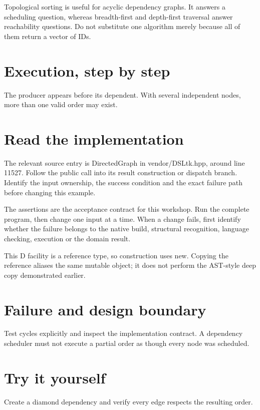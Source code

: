 \clearpage
{}
Topological sorting is useful for acyclic dependency graphs. It answers a scheduling question, whereas breadth-first and depth-first traversal answer reachability questions. Do not substitute one algorithm merely because all of them return a vector of IDs.


\section*{Execution, step by step}
The producer appears before its dependent. With several independent nodes, more than one valid order may exist.

\section*{Read the implementation}
The relevant source entry is DirectedGraph in vendor/DSLtk.hpp, around line 11527. Follow the public call into its result construction or dispatch branch. Identify the input ownership, the success condition and the exact failure path before changing this example.

The assertions are the acceptance contract for this workshop. Run the complete program, then change one input at a time. When a change fails, first identify whether the failure belongs to the native build, structural recognition, language checking, execution or the domain result.

\clearpage
{}
This D facility is a reference type, so construction uses new. Copying the reference aliases the same mutable object; it does not perform the AST-style deep copy demonstrated earlier.


\section*{Failure and design boundary}
Test cycles explicitly and inspect the implementation contract. A dependency scheduler must not execute a partial order as though every node was scheduled.

\section*{Try it yourself}
Create a diamond dependency and verify every edge respects the resulting order.

